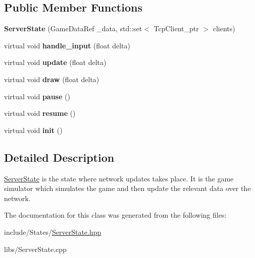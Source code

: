 \subsection*{Public Member Functions}
\begin{DoxyCompactItemize}
\item 
\mbox{\label{classcp_1_1_server_state_aa468fbc97117dc95b490529ab89b5998}} 
{\bfseries Server\+State} (Game\+Data\+Ref \+\_\+data, std\+::set$<$ Tcp\+Client\+\_\+ptr $>$ clients)
\item 
\mbox{\label{classcp_1_1_server_state_a50dff11b2bc3defc5b915dc23cf3facb}} 
virtual void {\bfseries handle\+\_\+input} (float delta)
\item 
\mbox{\label{classcp_1_1_server_state_a07143b5e396a15b32b8cb3896c0e7239}} 
virtual void {\bfseries update} (float delta)
\item 
\mbox{\label{classcp_1_1_server_state_ab43314cff0977d35aacdbf781cefff8c}} 
virtual void {\bfseries draw} (float delta)
\item 
\mbox{\label{classcp_1_1_server_state_a84a56ac8094e1b75551b170411af195f}} 
virtual void {\bfseries pause} ()
\item 
\mbox{\label{classcp_1_1_server_state_a7dd7b18f6b378e907fd286ba20bc9e11}} 
virtual void {\bfseries resume} ()
\item 
\mbox{\label{classcp_1_1_server_state_a54d67dcec1e8a1dad2fd94259dab7fd6}} 
virtual void {\bfseries init} ()
\end{DoxyCompactItemize}


\subsection{Detailed Description}
\hyperlink{classcp_1_1_server_state}{Server\+State} is the state where network updates takes place. It is the game simulator which simulates the game and then update the relevant data over the network. 

The documentation for this class was generated from the following files\+:\begin{DoxyCompactItemize}
\item 
include/\+States/\hyperlink{_server_state_8hpp}{Server\+State.\+hpp}\item 
libs/Server\+State.\+cpp\end{DoxyCompactItemize}
